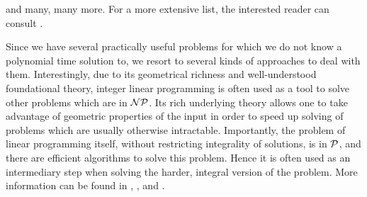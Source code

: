 \noindent and many, many more. For a more extensive list, the interested reader can consult \cite{Garey:1990:CIG:574848}.

Since we have several practically useful problems for which we do not know a polynomial time solution to, we resort to several kinds of approaches to deal with them. Interestingly, due to its geometrical richness and well-understood foundational theory, integer linear programming is often used as a tool to solve other problems which are in $\mathcal{NP}$. Its rich underlying theory allows one to take advantage of geometric properties of the input in order to speed up solving of problems which are usually otherwise intractable. Importantly, the problem of linear programming itself, without restricting integrality of solutions, is in $\mathcal{P}$, and there are efficient algorithms to solve this problem. Hence it is often used as an intermediary step when solving the harder, integral version of the problem. More information can be found in \cite{Nemhauser1988}, \cite{garfinkel-nemhauser}, and \cite{grotschel-lovasz-schrijver}.
